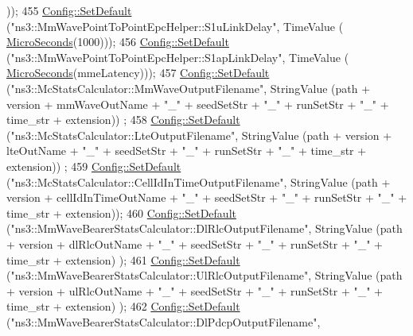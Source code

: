 \begin{DoxyCode}
{      ));
455   \hyperlink{group__config_ga2e7882df849d8ba4aaad31c934c40c06}{Config::SetDefault} (\textcolor{stringliteral}{"ns3::MmWavePointToPointEpcHelper::S1uLinkDelay"}, TimeValue (
      \hyperlink{group__timecivil_ga17465a639c8d1464e76538afdd78a9f0}{MicroSeconds}(1000)));
456   \hyperlink{group__config_ga2e7882df849d8ba4aaad31c934c40c06}{Config::SetDefault} (\textcolor{stringliteral}{"ns3::MmWavePointToPointEpcHelper::S1apLinkDelay"}, TimeValue (
      \hyperlink{group__timecivil_ga17465a639c8d1464e76538afdd78a9f0}{MicroSeconds}(mmeLatency)));
457   \hyperlink{group__config_ga2e7882df849d8ba4aaad31c934c40c06}{Config::SetDefault} (\textcolor{stringliteral}{"ns3::McStatsCalculator::MmWaveOutputFilename"}, StringValue        
               (path + version + mmWaveOutName + \textcolor{stringliteral}{"\_"} + seedSetStr + \textcolor{stringliteral}{"\_"} + runSetStr + \textcolor{stringliteral}{"\_"} + time\_str + extension))
      ;
458   \hyperlink{group__config_ga2e7882df849d8ba4aaad31c934c40c06}{Config::SetDefault} (\textcolor{stringliteral}{"ns3::McStatsCalculator::LteOutputFilename"}, StringValue           
               (path + version + lteOutName    + \textcolor{stringliteral}{"\_"} + seedSetStr + \textcolor{stringliteral}{"\_"} + runSetStr + \textcolor{stringliteral}{"\_"} + time\_str + extension))
      ;
459   \hyperlink{group__config_ga2e7882df849d8ba4aaad31c934c40c06}{Config::SetDefault} (\textcolor{stringliteral}{"ns3::McStatsCalculator::CellIdInTimeOutputFilename"}, StringValue  
               (path + version + cellIdInTimeOutName    + \textcolor{stringliteral}{"\_"} + seedSetStr + \textcolor{stringliteral}{"\_"} + runSetStr + \textcolor{stringliteral}{"\_"} + time\_str + 
      extension));
460   \hyperlink{group__config_ga2e7882df849d8ba4aaad31c934c40c06}{Config::SetDefault} (\textcolor{stringliteral}{"ns3::MmWaveBearerStatsCalculator::DlRlcOutputFilename"}, 
      StringValue        (path + version + dlRlcOutName   + \textcolor{stringliteral}{"\_"} + seedSetStr + \textcolor{stringliteral}{"\_"} + runSetStr + \textcolor{stringliteral}{"\_"} + time\_str + extension)
      );
461   \hyperlink{group__config_ga2e7882df849d8ba4aaad31c934c40c06}{Config::SetDefault} (\textcolor{stringliteral}{"ns3::MmWaveBearerStatsCalculator::UlRlcOutputFilename"}, 
      StringValue        (path + version + ulRlcOutName   + \textcolor{stringliteral}{"\_"} + seedSetStr + \textcolor{stringliteral}{"\_"} + runSetStr + \textcolor{stringliteral}{"\_"} + time\_str + extension)
      );
462   \hyperlink{group__config_ga2e7882df849d8ba4aaad31c934c40c06}{Config::SetDefault} (\textcolor{stringliteral}{"ns3::MmWaveBearerStatsCalculator::DlPdcpOutputFilename"}, 
}
\end{DoxyCode}
